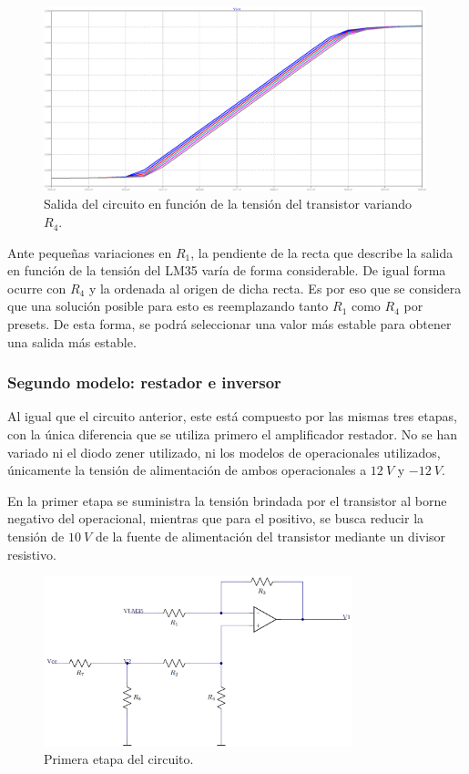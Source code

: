 \documentclass[a4paper]{article}
\begin{document}
\begin{figure}[H]
	\centering
	\includegraphics[width=0.99\textwidth]{Ejercicio6/Imagenes/StepR4-M1.png}
	\caption{Salida del circuito en función de la tensión del transistor variando $R_4$.}
	\label{fig:r4-M1}
\end{figure}

Ante pequeñas variaciones en $R_1$, la pendiente de la recta que describe la salida en función de la tensión del LM35 varía de forma considerable. De igual forma ocurre con $R_4$ y la ordenada al origen de dicha recta. Es por eso que se considera que una solución posible para esto es reemplazando tanto $R_1$ como $R_4$ por presets. De esta forma, se podrá seleccionar una valor más estable para obtener una salida más estable.

\subsubsection{Segundo modelo: restador e inversor}

Al igual que el circuito anterior, este está compuesto por las mismas tres etapas, con la única diferencia que se utiliza primero el amplificador restador. No se han variado ni el diodo zener utilizado, ni los modelos de operacionales utilizados, únicamente la tensión de alimentación de ambos operacionales a $12 \ V$ y $-12 \ V$.

En la primer etapa se suministra la tensión brindada por el transistor al borne negativo del operacional, mientras que para el positivo, se busca reducir la tensión de $10 \ V$ de la fuente de alimentación del transistor mediante un divisor resistivo. 

\begin{figure}[H]
	\centering
	\includegraphics[width=0.8\textwidth]{Ejercicio6/Imagenes/CircuitoEtapa1-M2.png}
\caption{Primera etapa del circuito.}
	\label{fig:cir1-M2}
\end{figure}
\end{document}
